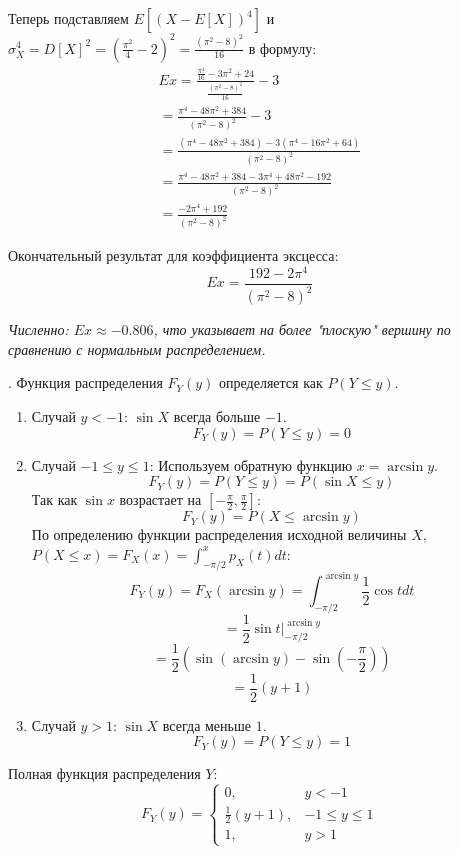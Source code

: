 \documentclass[a4paper,14pt]{extarticle}
\begin{document}
        Теперь подставляем $E[(X - E[X])^4]$ и $\sigma_X^4 = D[X]^2 = \left(\frac{\pi^2}{4} - 2\right)^2 = \frac{(\pi^2 - 8)^2}{16}$ в формулу:
        \begin{gather*}
        Ex = \frac{\frac{\pi^4}{16} - 3\pi^2 + 24}{\frac{(\pi^2 - 8)^2}{16}} - 3 \\
        = \frac{\pi^4 - 48\pi^2 + 384}{(\pi^2 - 8)^2} - 3 \\
        = \frac{(\pi^4 - 48\pi^2 + 384) - 3(\pi^4 - 16\pi^2 + 64)}{(\pi^2 - 8)^2} \\
        = \frac{\pi^4 - 48\pi^2 + 384 - 3\pi^4 + 48\pi^2 - 192}{(\pi^2 - 8)^2} \\
        = \frac{-2\pi^4 + 192}{(\pi^2 - 8)^2}
        \end{gather*}

        Окончательный результат для коэффициента эксцесса:
        $$
        \boxed{Ex = \frac{192 - 2\pi^4}{(\pi^2 - 8)^2}}
        $$

        \textit{Численно: $Ex \approx -0.806$, что указывает на более "плоскую" вершину по сравнению с нормальным распределением.}

        . Функция распределения $F_Y(y)$ определяется как $P(Y \le y)$.

    \begin{enumerate}
        \item Случай $y < -1$: $\sin X$ всегда больше $-1$.
        $$
        F_Y(y) = P(Y \le y) = 0
        $$
        \item Случай $-1 \le y \le 1$: Используем обратную функцию $x = \arcsin y$.
        $$
        F_Y(y) = P(Y \le y) = P(\sin X \le y)
        $$
        Так как $\sin x$ возрастает на $\left[-\frac{\pi}{2}, \frac{\pi}{2}\right]$:
        $$
        F_Y(y) = P(X \le \arcsin y)
        $$
        По определению функции распределения исходной величины $X$, $P(X \le x) = F_X(x) = \int_{-\pi/2}^{x} p_X(t) dt$:
        $$
        F_Y(y) = F_X(\arcsin y) = \int_{-\pi/2}^{\arcsin y} \frac{1}{2} \cos t dt
        $$
        \[ = \frac{1}{2} \sin t|_{-\pi/2}^{\arcsin y} \]
        \[ = \frac{1}{2} \left( \sin(\arcsin y) - \sin\left(-\frac{\pi}{2}\right) \right) \]
        \[ = \frac{1}{2}(y + 1)\]
        
        \item Случай $y > 1$: $\sin X$ всегда меньше $1$.
        $$
        F_Y(y) = P(Y \le y) = 1
        $$
    \end{enumerate}

    Полная функция распределения $Y$:
    $$
    \boxed{F_Y(y) = 
    \begin{cases} 
    0, & y < -1 \\
    \frac{1}{2}(y + 1), & -1 \le y \le 1 \\
    1, & y > 1
    \end{cases}}
    $$
\end{document}
